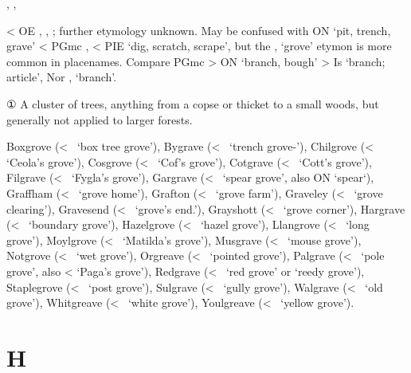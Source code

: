 \documentclass[12pt,letterpaper,oneside,article,draft]{memoir}
\begin{document}
\begin{Lemma}
\begin{Also}
	, , 
\end{Also}
\begin{Etymology}
	< OE , , ; further etymology unknown.
	May be confused with ON  ‘pit, trench, grave’ < PGmc , 
		< PIE  ‘dig, scratch, scrape’,
		but the ,  ‘grove’ etymon is more common in placenames.
	Compare PGmc  > ON  ‘branch, bough’ > Is  ‘branch; article’,
		Nor ,  ‘branch’.
\end{Etymology}
\begin{Definitions}
	① A cluster of trees, anything from a copse or thicket to a small woods, but generally not applied to larger forests.
\end{Definitions}
\begin{Examples}
	Boxgrove (<~ ‘box tree grove’),
	Bygrave (<~ ‘trench grove-’),
	Chilgrove (<~ ‘Ceola’s grove’),
	Cosgrove (<~ ‘Cof’s grove’),
	Cotgrave (<~ ‘Cott’s grove’),
	Filgrave (<~ ‘Fygla’s grove’),
	Gargrave (<~ ‘spear grove’, also ON  ‘spear‘),
	Graffham (<~ ‘grove home’),
	Grafton (<~ ‘grove farm’),
	Graveley (<~ ‘grove clearing’),
	Gravesend (<~ ‘grove’s end.’),
	Grayshott (<~ ‘grove corner’),
	Hargrave (<~ ‘boundary grove’),
	Hazelgrove (<~ ‘hazel grove’),
	Llangrove (<~ ‘long grove’),
	Moylgrove (<~ ‘Matilda’s grove’),
	Musgrave (<~ ‘mouse grove’),
	Notgrove (<~ ‘wet grove’),
	Orgreave (<~ ‘pointed grove’),
	Palgrave (<~ ‘pole grove’, also <  ‘Paga’s grove’),
	Redgrave (<~ ‘red grove’ or  ‘reedy grove’),
	Staplegrove (<~ ‘post grove’),
	Sulgrave (<~ ‘gully grove’),
	Walgrave (<~ ‘old grove’),
	Whitgreave (<~ ‘white grove’),
	Youlgreave (<~ ‘yellow grove’).
\end{Examples}
\end{Lemma}

\section*{H}
\end{document}
